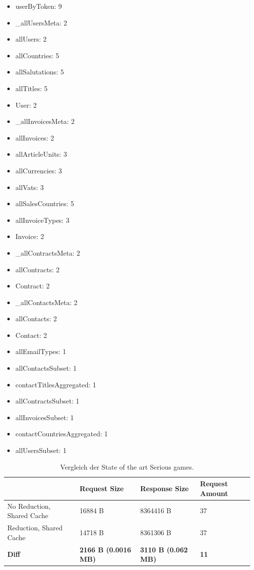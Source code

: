 \begin{itemize}
    \item userByToken: 9
    \item \_allUsersMeta: 2
    \item allUsers: 2
    \item allCountries: 5
    \item allSalutations: 5
    \item allTitles: 5
    \item User: 2
    \item \_allInvoicesMeta: 2
    \item allInvoices: 2
    \item allArticleUnits: 3
    \item allCurrencies: 3
    \item allVats: 3
    \item allSalesCountries: 5
    \item allInvoiceTypes: 3
    \item Invoice: 2
    \item \_allContractsMeta: 2
    \item allContracts: 2
    \item Contract: 2
    \item \_allContactsMeta: 2
    \item allContacts: 2
    \item Contact: 2
    \item allEmailTypes: 1
    \item allContactsSubset: 1
    \item contactTitlesAggregated: 1
    \item allContractsSubset: 1
    \item allInvoicesSubset: 1
    \item contactCountriesAggregated: 1
    \item allUsersSubset: 1
\end{itemize}

\begin{table}[]
    \begin{tabular}{|l|l|l|l|}
    \hline
                                    & Request Size & Response Size & Request Amount  \\
    \hline
     No Reduction, Shared Cache     &  16884 B        &  8364416 B   & 37 \\
     \hline
     Reduction, Shared Cache        &  14718 B        &  8361306 B   & 37 \\
     \hline
    \textbf{Diff}                   & \textbf{2166 B (0.0016 MB)} & \textbf{3110 B (0.062  MB)} & \textbf{11} \\
     \hline
    \end{tabular}
    \caption{Vergleich der State of the art Serious games.}
    \label{tab:serious-game-comparison}
\end{table}


